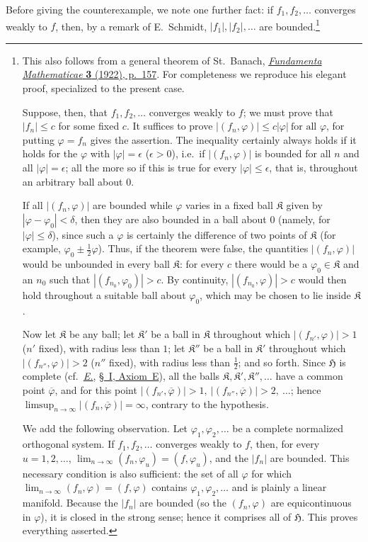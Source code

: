 \documentclass[
  paper=b5,
  twoside=true,
  fontsize=13pt,
  headings=normal,
  bookmarkpackage=false
]{scrartcl}
\theoremstyle{definition}
\newcommand{\Eref}{\hyperref[fn:E-paper]{\emph{E.}}}
\newcommand{\ErefText}[1]{\href{https://doi.org/10.1007/BF01782338}{#1}}
\begin{document}
Before giving the counterexample, we note one further fact: if
$f_1,f_2,\ldots$ converges weakly to $f$, then, by a remark of E.~Schmidt,
$|f_1|,|f_2|,\ldots$ are bounded.\footnote{\label{fn:32}%
This also follows from a general
theorem of St.~Banach, \href{https://doi.org/10.4064/fm-3-1-133-181}%
{\emph{Fundamenta Mathematicae} \textbf{3} (1922), p.~157}. For completeness we reproduce his elegant proof, specialized to
the present case.

Suppose, then, that $f_1,f_2,\ldots$ converges weakly to $f$; we must prove
that $|f_n|\leq c$ for some fixed $c$. It suffices to prove $|(f_n,\varphi)|\leq c|\varphi| \ \text{for all $\varphi$}$,
for putting $\varphi=f_n$ gives the assertion. The inequality
certainly always holds if it holds for the $\varphi$ with $|\varphi|=\epsilon$ ($\epsilon>0$), i.e.\ if $|(f_n,\varphi)|$ is bounded
for all $n$ and all $|\varphi|=\epsilon$; all the more so if this is true
for every $|\varphi|\leq\epsilon$, that is, throughout an arbitrary ball
about $0$.

If all $|(f_n,\varphi)|$ are bounded while $\varphi$ varies in a fixed ball $\mathfrak{K}$ given by $|\varphi-\varphi_0|<\delta$, then they are also
bounded in a ball about $0$ (namely, for $|\varphi|\leq\delta$), since such
a $\varphi$ is certainly the difference of two points of $\mathfrak{K}$
(for example, $\varphi_0\pm\frac12\varphi$). Thus, if the theorem were
false, the quantities $|(f_n,\varphi)|$ would be unbounded in every ball $\mathfrak{K}$: for every $c$ there would be a $\varphi_0\in\mathfrak{K}$
and an $n_0$ such that $|(f_{n_0},\varphi_0)|>c$. By continuity, $|(f_{n_0},\varphi)|>c$ would then hold throughout a suitable ball about $\varphi_0$, which may be chosen to lie inside $\mathfrak{K}$.

Now let $\mathfrak{K}$ be any ball; let $\mathfrak{K}'$ be a ball in $\mathfrak{K}$ throughout which $|(f_{n'},\varphi)|>1$ ($n'$ fixed), with
radius less than $1$; let $\mathfrak{K}''$ be a ball in $\mathfrak{K}'$
throughout which $|(f_{n''},\varphi)|>2$ ($n''$ fixed), with radius less
than $\frac12$; and so forth. Since $\mathfrak H$ is complete (cf.\ \Eref, \ErefText{\S~I, Axiom~E}), all the balls $\mathfrak{K},\mathfrak{K}',\mathfrak{K}'',\ldots$ have a common point $\overline\varphi$, and for this point $|(f_{n'},\overline\varphi)|>1,\  |(f_{n''},\overline\varphi)|>2,\ \ldots$;
hence $\limsup_{n\to\infty}|(f_n,\overline\varphi)|=\infty$,
contrary to the hypothesis.

We add the following observation. Let $\varphi_1,\varphi_2,\ldots$ be a complete normalized orthogonal system. If $f_1,f_2,\ldots$ converges weakly to $f$, then, for every $u=1,2,\ldots$, $\lim_{n\to\infty}(f_n,\varphi_u)=(f,\varphi_u)$,
and the $|f_n|$ are bounded. This necessary condition is also sufficient:
the set of all $\varphi$ for which $\lim_{n\to\infty}(f_n,\varphi)=(f,\varphi)$
contains $\varphi_1,\varphi_2,\ldots$ and is plainly a linear manifold.
Because the $|f_n|$ are bounded (so the $(f_n,\varphi)$ are equicontinuous
in $\varphi$), it is closed in the strong sense; hence it comprises all of $\mathfrak H$. This proves everything asserted.}
\end{document}
